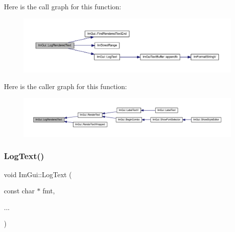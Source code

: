 Here is the call graph for this function\+:
\nopagebreak
\begin{figure}[H]
\begin{center}
\leavevmode
\includegraphics[width=350pt]{namespace_im_gui_a7a0d62e33f2236ec2f789e24ca0fb56f_cgraph}
\end{center}
\end{figure}
Here is the caller graph for this function\+:
\nopagebreak
\begin{figure}[H]
\begin{center}
\leavevmode
\includegraphics[width=350pt]{namespace_im_gui_a7a0d62e33f2236ec2f789e24ca0fb56f_icgraph}
\end{center}
\end{figure}
\mbox{\label{namespace_im_gui_aa548475d8f771ab6524d73d900a41198}} 
\subsubsection{\texorpdfstring{Log\+Text()}{LogText()}}
{\footnotesize\ttfamily void Im\+Gui\+::\+Log\+Text (\begin{DoxyParamCaption}\item[{const char $\ast$}]{fmt,  }\item[{}]{... }\end{DoxyParamCaption})}

